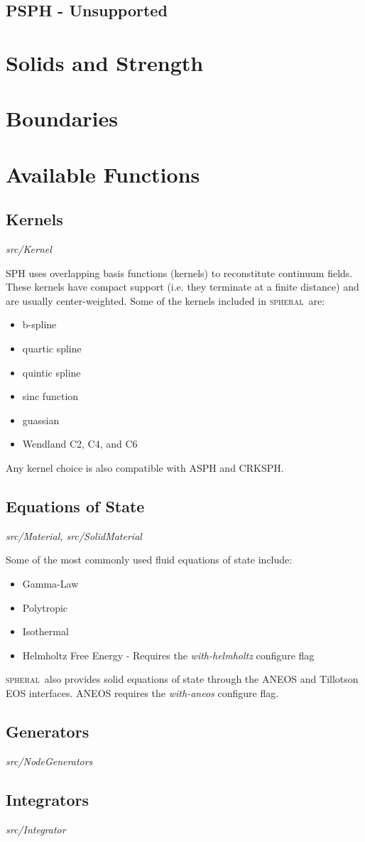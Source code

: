 \documentclass[11pt]{memoir}
\newcommand{\sph}{\textsc{spheral}}
\begin{document}
\section{PSPH - Unsupported}

\chapter{Solids and Strength}

\chapter{Boundaries}

\chapter{Available Functions}
\section{Kernels}

\textit{src/Kernel}

SPH uses overlapping basis functions (kernels) to reconstitute continuum fields.
These kernels have compact support (i.e. they terminate at a finite distance) and are usually center-weighted. 
Some of the kernels included in \sph\ are:
\begin{itemize}
\item b-spline
\item quartic spline
\item quintic spline
\item sinc function
\item guassian
\item Wendland C2, C4, and C6
\end{itemize}
Any kernel choice is also compatible with ASPH and CRKSPH.

\section{Equations of State}

\textit{src/Material, src/SolidMaterial}

Some of the most commonly used fluid equations of state include:
\begin{itemize}
\item Gamma-Law
\item Polytropic
\item Isothermal
\item Helmholtz Free Energy - Requires the \textit{with-helmholtz} configure flag
\end{itemize}

\sph\ also provides solid equations of state through the ANEOS and Tillotson EOS interfaces.
ANEOS requires the \textit{with-aneos} configure flag.

\section{Generators}

\textit{src/NodeGenerators}

\section{Integrators}

\textit{src/Integrator}
\end{document}
